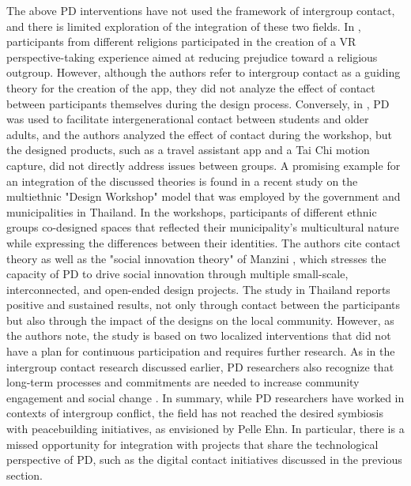 \documentclass[dissertation,math,vertlayout,pdfa,colorlinks,nologo]{aaltoseries}
\begin{document}
The above PD interventions have not used the framework of intergroup contact, and there is limited exploration of the integration of these two fields. In \cite{rifatCohabitantDesignImplementation2024}, participants from different religions participated in the creation of a VR perspective-taking experience aimed at reducing prejudice toward a religious outgroup. However, although the authors refer to intergroup contact as a guiding theory for the creation of the app, they did not analyze the effect of contact between participants themselves during the design process. Conversely, in \cite{cheungEliminatingAgeismHigher2023}, PD was used to facilitate intergenerational contact between students and older adults, and the authors analyzed the effect of contact during the workshop, but the designed products, such as a travel assistant app and a Tai Chi motion capture, did not directly address issues between groups. A promising example for an integration of the discussed theories is found in a recent study on the multiethnic "Design Workshop" model that was employed by the government and municipalities in Thailand. In the workshops, participants of different ethnic groups co-designed spaces that reflected their municipality's multicultural nature while expressing the differences between their identities. The authors cite contact theory as well as the "social innovation theory" of Manzini \cite{manziniDesignWhenEverybody2015}, which stresses the capacity of PD to drive social innovation through multiple small-scale, interconnected, and open-ended design projects. The study in Thailand reports positive and sustained results, not only through contact between the participants but also through the impact of the designs on the local community. However, as the authors note, the study is based on two localized interventions that did not have a plan for continuous participation and requires further research. As in the intergroup contact research discussed earlier, PD researchers also recognize that long-term processes and commitments are needed to increase community engagement and social change \cite{saad-sulonenUnfoldingParticipationTime2018a}. In summary, while PD researchers have worked in contexts of intergroup conflict, the field has not reached the desired symbiosis with peacebuilding initiatives, as envisioned by Pelle Ehn. In particular, there is a missed opportunity for integration with projects that share the technological perspective of PD, such as the digital contact initiatives discussed in the previous section.
\end{document}
